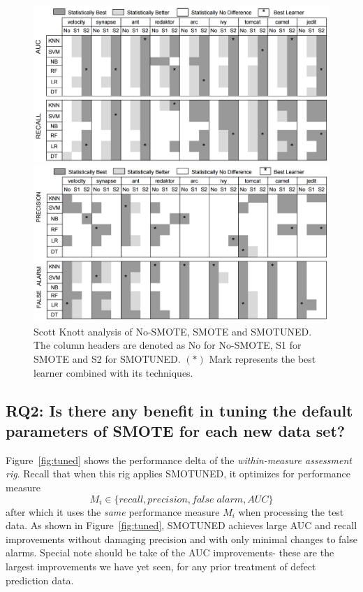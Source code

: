\documentclass[10pt,conference]{IEEEtran}
\theoremstyle{break}
\theoremstyle{break}
\begin{document}
\begin{figure}[!t]
\begin{minipage}{.5\linewidth}
\centering
        \includegraphics[width=1\linewidth]{./fig/AUC_recall.png}
            \end{minipage}%
\begin{minipage}{.5\linewidth}
        \centering
        \includegraphics[width=1\linewidth]{./fig/prec_pf.png}
    \end{minipage}%
    \caption{Scott Knott analysis of No-SMOTE, SMOTE and SMOTUNED. The column headers are denoted as No for No-SMOTE, S1 for SMOTE and S2 for SMOTUNED. $(\ast)$ Mark represents the best learner combined with its techniques.}
    \label{fig:stats}
\vspace{-0.2cm}
\end{figure}


\subsection {{\bf RQ2}: Is there any benefit in tuning the default parameters of SMOTE for each new data set?}

Figure~\ref{fig:tuned} shows the performance delta of the {\em within-measure assessment rig}.
Recall that when this rig applies SMOTUNED, it optimizes for performance measure
\[M_i \in \{ 
\mathit{recall},
\mathit{precision}, 
\mathit{false\; alarm},
\mathit{AUC}
\}
\]
after which it uses the {\em same} performance measure
$M_i$ when processing the test data.
As shown in Figure~\ref{fig:tuned}, 
SMOTUNED achieves large AUC and recall improvements
without
 damaging precision and  with only minimal changes
 to false alarms. Special note should be take of the AUC improvements- these are the largest improvements
 we have yet seen, for any prior treatment of defect prediction data.
\end{document}
